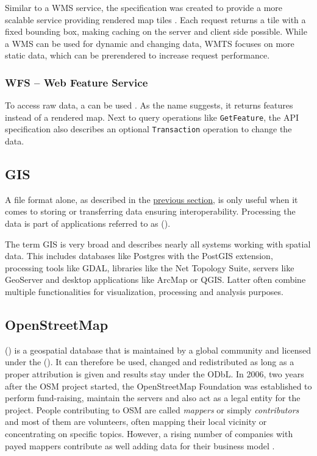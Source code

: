 			Similar to a WMS service, the  specification was created to provide a more scalable service providing rendered map tiles \cite{ogc-wmts}.
			Each request returns a tile with a fixed bounding box, making caching on the server and client side possible.
			While a WMS can be used for dynamic and changing data, WMTS focuses on more static data, which can be prerendered to increase request performance.
		
		\subsubsection{WFS -- Web Feature Service}
		
			To access raw data, a  can be used \cite{ogc-wfs}.
			As the name suggests, it returns features instead of a rendered map.
			Next to query operations like \texttt{GetFeature}, the API specification also describes an optional \texttt{Transaction} operation to change the data.
	
	\subsection{GIS}
	
		A file format alone, as described in the \hyperref[subsec:file-formats]{previous section}, is only useful when it comes to storing or transferring data ensuring interoperability.
		Processing the data is part of applications referred to as  ().
		
		The term GIS is very broad and describes nearly all systems working with spatial data.
		This includes databases like Postgres with the PostGIS extension, processing tools like GDAL, libraries like the Net Topology Suite, servers like GeoServer and desktop applications like ArcMap or QGIS.
		Latter often combine multiple functionalities for visualization, processing and analysis purposes.
	
	\subsection{OpenStreetMap}
	\label{subsec:osm}
	
		 () is a geospatial database that is maintained by a global community and licensed under the  ()\cite{osm-wiki-about}.
		It can therefore be used, changed and redistributed as long as a proper attribution is given and results stay under the ODbL\cite{odbl-summary}.
		In 2006, two years after the OSM project started, the OpenStreetMap Foundation was established to perform fund-raising, maintain the servers and also act as a legal entity for the project.
		People contributing to OSM are called \textit{mappers} or simply \textit{contributors} and most of them are volunteers, often mapping their local vicinity or concentrating on specific topics.
		However, a rising number of companies with payed mappers contribute as well adding data for their business model \cite{osm-corporate-mappers}.
		
